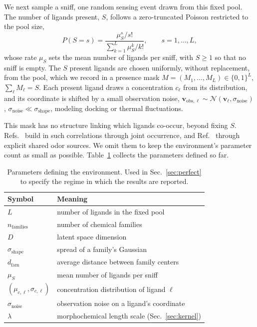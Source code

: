 \documentclass[aps,pre,superscriptaddress,floatfix,longbibliography,linenumbers]{revtex4-2}
\begin{document}
We next sample a sniff, one random sensing event drawn from this fixed
pool. The number of ligands present, $S$, follows a zero-truncated Poisson
restricted to the pool size,
\begin{equation}
P(S=s) = \frac{\mu_S^s/s!}{\sum_{k=1}^{L}\mu_S^k/k!}, \qquad s=1,\dots,L,
\label{eq:ztp}
\end{equation}
whose rate $\mu_S$ sets the mean number of ligands per sniff, with $S\ge1$
so that no sniff is empty. The $S$ present ligands are chosen uniformly,
without replacement, from the pool, which we record in a presence mask
$M=(M_1,\dots,M_L)\in\{0,1\}^L$, $\sum_\ell M_\ell = S$. Each present ligand
draws a concentration $c_\ell$ from its distribution, and its coordinate is
shifted by a small observation noise,
$\mathbf v_{\text{obs},\ell}\sim\mathcal N(\mathbf v_\ell,\sigma_\text{noise})$,
$\sigma_\text{noise}\ll\sigma_\text{shape}$, modeling docking or thermal
fluctuations.

This mask has no structure linking which ligands co-occur, beyond fixing
$S$. Refs.~\cite{zwicker_receptor_2016,tesileanu_adaptation_2019} build in
such correlations through joint occurrence, and
Ref.~\cite{del_castillo_convergent_2026} through explicit shared odor
sources. We omit them to keep the environment's parameter count as small as
possible. Table~\ref{tab:env_params} collects the parameters defined so far.

\begin{table}[t]
\centering
\begin{tabular}{ll}
Symbol & Meaning \\
\hline
$L$ & number of ligands in the fixed pool \\
$n_\text{families}$ & number of chemical families \\
$D$ & latent space dimension \\
$\sigma_\text{shape}$ & spread of a family's Gaussian \\
$d_\text{fam}$ & average distance between family centers \\
$\mu_S$ & mean number of ligands per sniff \\
$(\mu_{c,\ell},\sigma_{c,\ell})$ & concentration distribution of ligand $\ell$ \\
$\sigma_\text{noise}$ & observation noise on a ligand's coordinate \\
$\lambda$ & morphochemical length scale (Sec.~\ref{sec:kernel}) \\
\end{tabular}
\caption{Parameters defining the environment. Used in Sec.~\ref{sec:perfect}
to specify the regime in which the results are reported.}
\label{tab:env_params}
\end{table}
\end{document}
